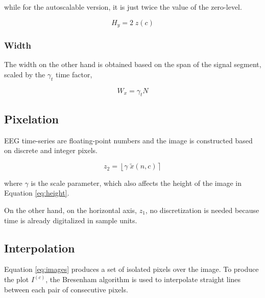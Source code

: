 \noindent while for the autoscalable version, it is just twice the value of the zero-level.

\begin{equation}
H_y = 2 \; z(c)
\label{eq:autoscaleheight}
\end{equation}


\subsubsection{Width}

The width on the other hand is obtained based on the span of the signal segment, scaled by the $\gamma_t$  time factor,

\begin{equation}
W_x = \gamma_t  N
\label{eq:width}
\end{equation}


\subsection{Pixelation}

EEG time-series are floating-point numbers and the image is constructed based on discrete and integer pixels.  

\begin{equation}
z_2 = \left \lfloor{ \gamma  \; \tilde{x}(n,c)  }\right \rceil
\label{eq:standarizedaverages}
\end{equation}

\noindent where $\gamma$ is the scale parameter, which also affects the height of the image in Equation \ref{eq:height}.

On the other hand, on the horizontal axis, $z_1$, no discretization is needed because time is already digitalized in sample units. 

\subsection{Interpolation}

Equation \ref{eq:images} produces a set of isolated pixels over the image.  To produce the plot $I^{(c)}$, the Bresenham \cite{Bresenham1965,Ramele2016} algorithm is used to interpolate straight lines between each pair of consecutive pixels.

